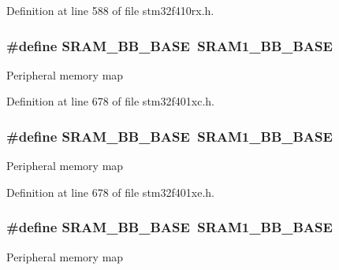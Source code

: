 Definition at line 588 of file stm32f410rx.\+h.

\subsubsection[{\texorpdfstring{S\+R\+A\+M\+\_\+\+B\+B\+\_\+\+B\+A\+SE}{SRAM_BB_BASE}}]{\setlength{\rightskip}{0pt plus 5cm}\#define S\+R\+A\+M\+\_\+\+B\+B\+\_\+\+B\+A\+SE~{\bf S\+R\+A\+M1\+\_\+\+B\+B\+\_\+\+B\+A\+SE}}\hypertarget{group___peripheral__registers__structures_gad3548b6e2f017f39d399358f3ac98454}{}\label{group___peripheral__registers__structures_gad3548b6e2f017f39d399358f3ac98454}
Peripheral memory map 

Definition at line 678 of file stm32f401xc.\+h.

\subsubsection[{\texorpdfstring{S\+R\+A\+M\+\_\+\+B\+B\+\_\+\+B\+A\+SE}{SRAM_BB_BASE}}]{\setlength{\rightskip}{0pt plus 5cm}\#define S\+R\+A\+M\+\_\+\+B\+B\+\_\+\+B\+A\+SE~{\bf S\+R\+A\+M1\+\_\+\+B\+B\+\_\+\+B\+A\+SE}}\hypertarget{group___peripheral__registers__structures_gad3548b6e2f017f39d399358f3ac98454}{}\label{group___peripheral__registers__structures_gad3548b6e2f017f39d399358f3ac98454}
Peripheral memory map 

Definition at line 678 of file stm32f401xe.\+h.

\subsubsection[{\texorpdfstring{S\+R\+A\+M\+\_\+\+B\+B\+\_\+\+B\+A\+SE}{SRAM_BB_BASE}}]{\setlength{\rightskip}{0pt plus 5cm}\#define S\+R\+A\+M\+\_\+\+B\+B\+\_\+\+B\+A\+SE~{\bf S\+R\+A\+M1\+\_\+\+B\+B\+\_\+\+B\+A\+SE}}\hypertarget{group___peripheral__registers__structures_gad3548b6e2f017f39d399358f3ac98454}{}\label{group___peripheral__registers__structures_gad3548b6e2f017f39d399358f3ac98454}
Peripheral memory map 


